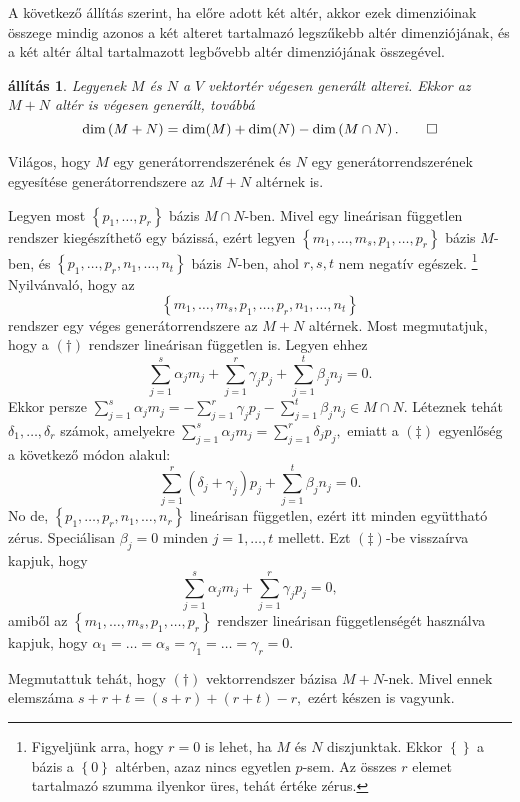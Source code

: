 \documentclass[9pt, a4paper, showtrims]{memoir}
\makeatletter
\renewenvironment{proof}[1][\proofname]
    {\par\pushQED{\qed}%
    \normalfont \topsep6\p@\@plus6\p@\relax
    \trivlist
    \item[\hskip\labelsep
        \itshape
    #1\@addpunct{:}]\ignorespaces}
    {\popQED\endtrivlist\@endpefalse}
\theoremstyle{plain}
\newtheorem{proposition}{állítás}[chapter]
\theoremstyle{remark}
\theoremstyle{definition}
\makeatother
\begin{document}
A következő állítás szerint,
ha előre adott két altér, akkor ezek dimenzióinak összege mindig azonos
a két alteret tartalmazó legszűkebb altér dimenziójának,
és a két altér által tartalmazott legbővebb altér  dimenziójának összegével.
\begin{proposition}\label{pr:drosszeg2}
	Legyenek $M$ és $N$ a $V$ vektortér végesen generált alterei.
	Ekkor az $M+N$ altér is végesen generált,
	továbbá
	\[
		\dim\left( M+N \right)=\dim(M)+\dim(N)-\dim \left( M\cap N \right).\qedhere
	\]
\end{proposition}
\begin{proof}
	Világos, hogy $M$ egy generátorrendszerének és $N$ egy generátorrendszerének egyesítése
	generátorrendszere az $M+N$ altérnek is.

	Legyen most $\left\{ p_1,\ldots,p_r \right\}$ bázis $M\cap N$-ben.
	Mivel egy lineárisan független rendszer kiegészíthető egy bázissá,
	ezért legyen
	$\left\{ m_1,\ldots,m_s,p_1,\ldots,p_r \right\}$ bázis $M$-ben,
	és
	$\left\{ p_1,\ldots,p_r,n_1,\ldots,n_t \right\}$ bázis $N$-ben,
	ahol $r,s,t$ nem negatív egészek.%
	\footnote{
		Figyeljünk arra, hogy $r=0$ is lehet, ha $M$ és $N$ diszjunktak.
		Ekkor $\left\{  \right\}$ a bázis a $\left\{ 0 \right\}$ altérben,
		azaz nincs egyetlen $p$-sem.
		Az összes $r$ elemet tartalmazó szumma ilyenkor üres, tehát értéke zérus.
	}
	Nyilvánvaló, hogy az
	\[
		\left\{ m_1,\ldots,m_s,p_1,\ldots,p_r,n_1,\ldots,n_t \right\}\tag{\dag}
	\]
	rendszer egy véges generátorrendszere az $M+N$ altérnek.
	Most megmutatjuk,
	hogy a $(\dag)$ rendszer lineárisan független is.
	Legyen ehhez
	\[
		\sum_{j=1}^s\alpha_j m_j+\sum_{j=1}^r\gamma_j p_j+\sum_{j=1}^t\beta_jn_j=0.\tag{\ddag}
	\]
	Ekkor persze
	\(
	\sum_{j=1}^s\alpha_j m_j =
	-\sum_{j=1}^r\gamma_j p_j
	-\sum_{j=1}^t\beta_jn_j
	\in
	M\cap N.
	\)
	Léteznek tehát $\delta_1,\ldots,\delta_r$ számok,
	amelyekre
	\(
	\sum_{j=1}^s\alpha_j m_j=
	\sum_{j=1}^r\delta_j p_j,
	\)
	emiatt a $(\ddag)$ egyenlőség a következő módon alakul:
	\[
		\sum_{j=1}^r\left( \delta_j+\gamma_j \right)p_j+\sum_{j=1}^t\beta_jn_j=0.
	\]
	No de, $\left\{ p_1,\ldots,p_r,n_1,\ldots,n_r \right\}$ lineárisan független,
	ezért itt minden együttható zérus.
	Speciálisan $\beta_j=0$ minden $j=1,\ldots,t$ mellett.
	Ezt $(\ddag)$-be visszaírva kapjuk, hogy
	\[
		\sum_{j=1}^s\alpha_j m_j+\sum_{j=1}^r\gamma_j p_j=0,
	\]
	amiből az $\left\{ m_1,\ldots,m_s,p_1,\ldots,p_r \right\}$ rendszer lineárisan függetlenségét használva kapjuk,
	hogy $\alpha_1=\dots=\alpha_s=\gamma_1=\dots=\gamma_r=0$.


	Megmutattuk tehát, hogy $(\dag)$ vektorrendszer bázisa $M+N$-nek.
	Mivel ennek elemszáma
	\begin{math}
		s+r+t=\left( s+r \right)+\left( r+t \right)-r,
	\end{math}
	ezért készen is vagyunk.
\end{proof}
\end{document}
